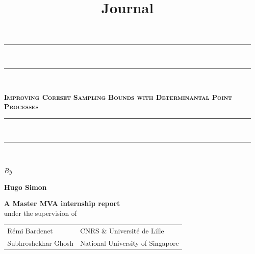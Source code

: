 \documentclass{report} %
\newcommand{\1}{\mathds{1}} %
\theoremstyle{definition} %
\begin{document}
    \title{Journal}

\begin{titlepage}
    \begin{center}
        \vspace*{25pt} {
        \begin{spacing}{0.05}
            \rule{400pt}{2pt}\\
            \rule{400pt}{0.75pt}\\
        \end{spacing}
        \vspace{20pt}
        \begin{spacing}{0.9}
            \fontsize{26pt}{26pt}\selectfont%
            \textsc{\textbf{Improving Coreset Sampling Bounds with Determinantal Point Processes}}\\%
        \end{spacing}
        \vspace{5pt}
        \begin{spacing}{0.05}
            \rule{400pt}{0.75pt}\\
            \rule{400pt}{2pt}\\
        \end{spacing}
        }
    
        \vspace*{1cm}
        \begin{large}
        \textit{By}\\%
        \end{large}
    
    
        \vspace*{4pt}
        \begin{Large}
        \textbf{Hugo Simon}\\%
        \end{Large}
    
    \begin{large}
        \vspace*{5cm}
        \textbf{
        A Master MVA internship report }
        \vspace*{6pt}\\
        under the supervision of
        \vspace*{20pt}\\
    
        \begin{longtable*}{ p{0.4\textwidth} p{0.5\textwidth} }
            R\'emi Bardenet & CNRS \& Université de Lille
            \tabularnewline Subhroshekhar Ghosh & National University of Singapore
            \tabularnewline
        \end{longtable*}
    \end{large}
    

\end{center}
\end{titlepage}
\end{document}
